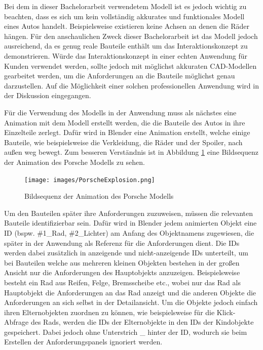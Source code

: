 Bei dem in dieser Bachelorarbeit verwendetem Modell ist es jedoch wichtig zu beachten, dass es sich um kein vollständig akkurates und funktionales Modell eines Autos handelt.
Beispielsweise existieren keine Achsen an denen die Räder hängen.
Für den anschaulichen Zweck dieser Bachelorarbeit ist das Modell jedoch ausreichend, da es genug \glqq{}reale\grqq{}  Bauteile enthält um das Interaktionskonzept zu demonstrieren.
Würde das Interaktionskonzept in einer echten Anwendung für Kunden verwendet werden, sollte jedoch mit möglichst akkuraten CAD-Modellen gearbeitet werden, um die Anforderungen an die Bauteile möglichst genau darzustellen.
Auf die Möglichkeit einer solchen professionellen Anwendung wird in der Diskussion eingegangen.

Für die Verwendung des Modells in der Anwendung muss als nächstes eine Animation mit dem Modell erstellt werden, die die Bauteile des Autos in ihre Einzelteile zerlegt.
Dafür wird in Blender eine Animation erstellt, welche einige Bauteile, wie beispielsweise die Verkleidung, die Räder und der Spoiler, nach außen weg bewegt.
Zum besseren Verständnis ist in Abbildung \ref{fig:porsche-explosion} eine Bildsequenz der Animation des Porsche Modells zu sehen.

\begin{figure}[H]
    \centering
    \texttt{[image: images/PorscheExplosion.png]}
    \caption{Bildsequenz der Animation des Porsche Modells}
    \label{fig:porsche-explosion}
\end{figure}

Um den Bauteilen später ihre Anforderungen zuzuweisen, müssen die relevanten Bauteile identifizierbar sein.
Dafür wird in Blender jedem animierten Objekt eine ID (bspw. \#1\_Rad, \#2\_Lichter) am Anfang des Objektnamens zugewiesen, die später in der Anwendung als Referenz für die Anforderungen dient.
Die IDs werden dabei zusätzlich in anzeigende und nicht-anzeigende IDs unterteilt, um bei Bauteilen welche aus mehreren kleinen Objekten bestehen in der großen Ansicht nur die Anforderungen des Hauptobjekts anzuzeigen.
Beispielsweise besteht ein Rad aus Reifen, Felge, Bremsscheibe etc., wobei nur das Rad als Hauptobjekt die Anforderungen an das Rad anzeigt und die anderen Objekte die Anforderungen an sich selbst in der Detailansicht.
Um die Objekte jedoch einfach ihren Elternobjekten zuordnen zu können, wie beispielsweise für die Klick-Abfrage des Rads, werden die IDs der Elternobjekte in den IDs der Kindobjekte gespeichert.
Dabei jedoch ohne Unterstrich \glqq{}\_\grqq{} hinter der ID, wodurch sie beim Erstellen der Anforderungspanels ignoriert werden.

